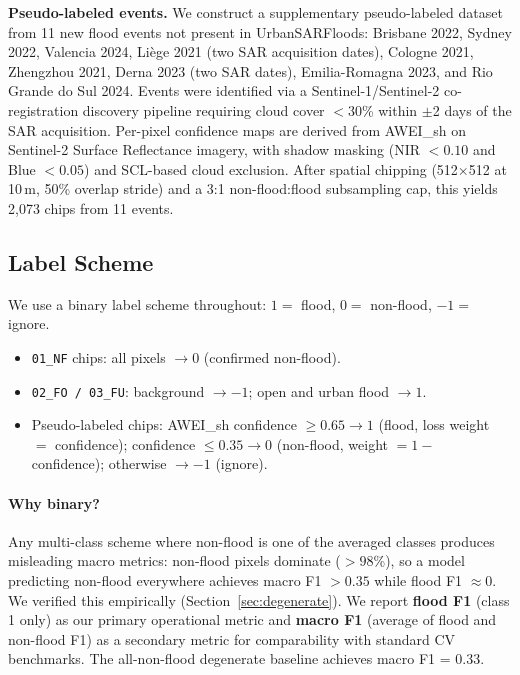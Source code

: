 \documentclass[10pt,twocolumn]{article}
\begin{document}
\textbf{Pseudo-labeled events.}  We construct a supplementary
pseudo-labeled dataset from 11 new flood events not present in
UrbanSARFloods: Brisbane 2022, Sydney 2022, Valencia 2024,
Liège 2021 (two SAR acquisition dates), Cologne 2021,
Zhengzhou 2021, Derna 2023 (two SAR dates), Emilia-Romagna 2023,
and Rio Grande do Sul 2024.
Events were identified via a Sentinel-1/Sentinel-2 co-registration
discovery pipeline requiring cloud cover $< 30$\% within $\pm$2 days
of the SAR acquisition.
Per-pixel confidence maps are derived from AWEI\_sh on
Sentinel-2 Surface Reflectance imagery, with shadow masking
(NIR $< 0.10$ and Blue $< 0.05$) and SCL-based cloud exclusion.
After spatial chipping (512$\times$512 at 10\,m, 50\% overlap stride)
and a 3:1 non-flood:flood subsampling cap, this yields 2,073 chips
from 11 events.

\subsection{Label Scheme}

We use a binary label scheme throughout: $1 =$ flood, $0 =$ non-flood,
$-1 =$ ignore.

\begin{itemize}
  \item \texttt{01\_NF} chips: all pixels $\to 0$ (confirmed non-flood).
  \item \texttt{02\_FO / 03\_FU}: background $\to -1$; open and urban
        flood $\to 1$.
  \item Pseudo-labeled chips: AWEI\_sh confidence $\geq 0.65 \to 1$
        (flood, loss weight $=$ confidence);
        confidence $\leq 0.35 \to 0$
        (non-flood, weight $= 1 -$ confidence);
        otherwise $\to -1$ (ignore).
\end{itemize}

\paragraph{Why binary?}
Any multi-class scheme where non-flood is one of the averaged classes
produces misleading macro metrics: non-flood pixels dominate ($>98$\%),
so a model predicting non-flood everywhere achieves macro F1 $> 0.35$
while flood F1 $\approx 0$.  We verified this empirically
(Section~\ref{sec:degenerate}).  We report \textbf{flood F1}
(class 1 only) as our primary operational metric and
\textbf{macro F1} (average of flood and non-flood F1) as a
secondary metric for comparability with standard CV benchmarks.
The all-non-flood degenerate baseline achieves macro F1 = 0.33.
\end{document}
